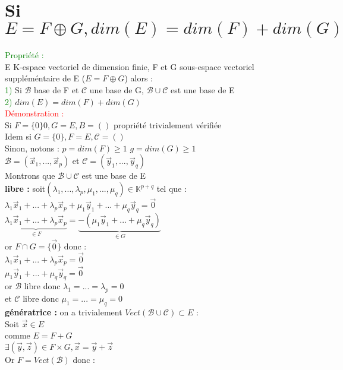 \documentclass{article}
\begin{document}
\section{Si $E= F \oplus G, dim(E)=dim(F)+dim(G)$}
\textcolor{green}{Propriété :} \\
E K-espace vectoriel de dimension finie, F et G sous-espace vectoriel suppléméntaire de E ($E=F \oplus G$) alors : \\
\textcolor{green}{1)} Si $\mathcal B$ base de F et $\mathcal C$ une base de G, $\mathcal B \cup \mathcal C$ est une base de E \\
\textcolor{green}{2)} $dim(E)=dim(F)+dim(G)$ \\
\textcolor{red}{Démonstration :} \\
Si $F=\lbrace 0 \rbrace 0,G=E,B=()$ propriété trivialement vérifiée \\
Idem si $G=\lbrace 0 \rbrace,F=E,\mathcal C=() $ \\
Sinon, notons : $p=dim(F) \geq 1$ $g=dim(G) \geq 1$ \\
$\mathcal B = (\vec x_1, ... ,\vec x_p)$ et $\mathcal C = (\vec y_1, ..., \vec y_q)$ \\
Montrons que $\mathcal B \cup \mathcal C$ est une base de E  \\
{\bf libre :} soit$(\lambda_1,...,\lambda_p,\mu_1,...,\mu_q) \in \mathbb K^{p+q}$ tel que : \\
$\lambda_1 \vec x_1 + ... + \lambda_p \vec x_p + \mu_1 \vec y_1 +... + \mu_q \vec y_q = \vec 0$ \\
$\underbrace{\lambda_1 \vec x_1 + ... + \lambda_p \vec x_p}_{\in F} = \underbrace{ -(\mu_1 \vec y_1 +... + \mu_q \vec y_q)}_{\in G}$ \\
or $F \cap  G =\lbrace \vec 0 \rbrace$ donc : \\
$\lambda_1 \vec x_1 + ... + \lambda_p \vec x_p=\vec 0$ \\
$\mu_1 \vec y_1 +... + \mu_q \vec y_q=\vec 0$ \\
or $\mathcal B$ libre donc $ \lambda_1=...=\lambda_p=0$ \\
et $\mathcal C$ libre donc $\mu_1=...=\mu_q=0$ \\
{\bf génératrice :} on a trivialement $Vect(\mathcal B \cup \mathcal C) \subset E$ : \\
Soit $\vec x \in E$ \\
comme $E=F +G $ \\
$\exists (\vec y, \vec z) \in F \times G, \vec x =\vec y + \vec z$ \\
Or $F= Vect(\mathcal B)$ donc : \\
\end{document}
